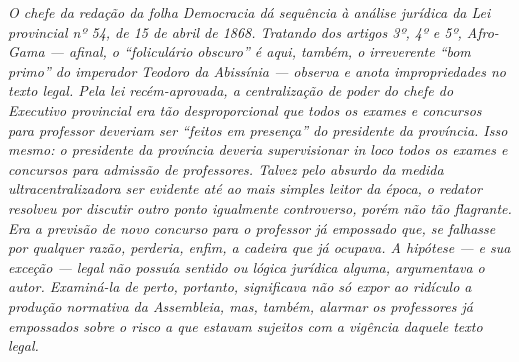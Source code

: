\begin{didascalia}\itshape
O chefe da redação da folha \textnormal{Democracia} dá sequência à análise
jurídica da Lei provincial nº 54, de 15 de abril de 1868. Tratando dos artigos
3º, 4º e 5º, Afro-Gama --- afinal, o ``foliculário obscuro'' é
aqui, também, o irreverente ``bom primo'' do imperador Teodoro da
Abissínia --- observa e anota impropriedades no texto legal. Pela lei
recém-aprovada, a centralização de poder do chefe do Executivo
provincial era tão desproporcional que todos os exames e concursos para
professor deveriam ser ``feitos em presença'' do presidente da província.
Isso mesmo: o presidente da província deveria supervisionar \textnormal{in loco}
todos os exames e concursos para admissão de professores. Talvez
pelo absurdo da medida ultracentralizadora ser evidente até ao mais
simples leitor da época, o redator resolveu por discutir outro ponto
igualmente controverso, porém não tão flagrante. Era a previsão de novo
concurso para o professor já empossado que, se falhasse por qualquer
razão, perderia, enfim, a cadeira que já ocupava. A hipótese --- e sua
exceção --- legal não possuía sentido ou lógica jurídica alguma,
argumentava o autor. Examiná-la de perto, portanto, significava não só
expor ao ridículo a produção normativa da Assembleia, mas, também,
alarmar os professores já empossados sobre o risco a que estavam
sujeitos com a vigência daquele texto legal.
\end{didascalia}




